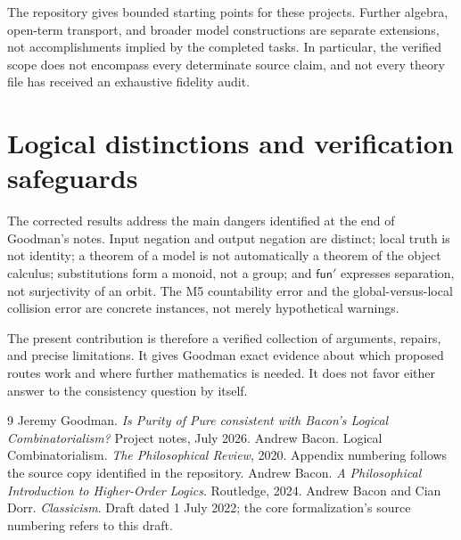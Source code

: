 \documentclass[12pt,leqno]{article}
\newcommand{\funp}{\mathsf{fun}'}
\begin{document}
The repository gives bounded starting points for these projects. Further
algebra, open-term transport, and broader model constructions are separate
extensions, not accomplishments implied by the completed tasks. In
particular, the verified scope does not encompass every determinate source
claim, and not every theory file has received an exhaustive fidelity audit.

\section{Logical distinctions and verification safeguards}

The corrected results address the main dangers identified at the end of
Goodman's notes. Input negation and output negation are distinct; local
truth is not identity; a theorem of a model is not automatically a theorem
of the object calculus; substitutions form a monoid, not a group; and
$\funp$ expresses separation, not surjectivity of an orbit. The M5
countability error and the global-versus-local collision error are concrete
instances, not merely hypothetical warnings.

The present contribution is therefore a verified collection of arguments,
repairs, and precise limitations. It gives Goodman exact evidence about
which proposed routes work and where further mathematics is needed. It
does not favor either answer to the consistency question by itself.

\begin{thebibliography}{9}
 Jeremy Goodman. \emph{Is Purity of Pure consistent with
Bacon's Logical Combinatorialism?} Project notes, July 2026.
 Andrew Bacon. Logical Combinatorialism.
\emph{The Philosophical Review}, 2020. Appendix numbering follows the
source copy identified in the repository.
 Andrew Bacon. \emph{A Philosophical Introduction to
Higher-Order Logics}. Routledge, 2024.
 Andrew Bacon and Cian Dorr. \emph{Classicism}.
Draft dated 1 July 2022; the core formalization's source numbering refers
to this draft.
\end{thebibliography}
\end{document}
